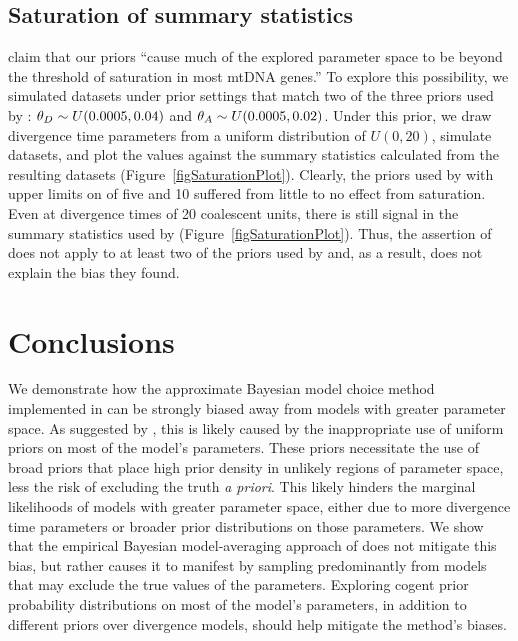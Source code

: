 \documentclass[letterpaper,12pt]{article}
\begin{document}
\begin{linenumbers}
\subsection*{Saturation of summary statistics}
\citet{Hickerson2013} claim that our priors ``cause much of the explored
parameter space to be beyond the threshold of saturation in most mtDNA genes.''
To explore this possibility, we simulated datasets under prior settings that
match two of the three priors used by \citet{Oaks2012}: $\meanDescendantTheta{}
\sim U(0.0005, 0.04)$ and $\ancestralTheta{} \sim U(0.0005, 0.02)$.
Under this prior, we draw divergence time parameters from a uniform
distribution of $U(0, 20)$, simulate datasets, and plot the \divt{} values
against the summary statistics calculated from the resulting datasets
(Figure~\ref{figSaturationPlot}).
Clearly, the priors used by \citet{Oaks2012} with upper limits on \divt{} of five
and 10 suffered from little to no effect from saturation.
Even at divergence times of 20 coalescent units, there is still signal in the
summary statistics used by \msb (Figure~\ref{figSaturationPlot}).
Thus, the assertion of \citet{Hickerson2013} does not apply to at least
two of the priors used by \citet{Oaks2012} and, as a result, does not
explain the bias they found.



\section*{Conclusions}
We demonstrate how the approximate Bayesian model choice method implemented in
\msb can be strongly biased away from models with greater parameter space.
As suggested by \citet{Oaks2012}, this is likely caused by the inappropriate
use of uniform priors on most of the model's parameters.
These priors necessitate the use of broad priors that place high prior density
in unlikely regions of parameter space, less the risk of excluding the truth
\emph{a priori}.
This likely hinders the marginal likelihoods of models with greater parameter
space, either due to more divergence time parameters or broader prior
distributions on those parameters.
We show that the empirical Bayesian model-averaging approach of
\citet{Hickerson2013} does not mitigate this bias, but rather causes it to
manifest by sampling predominantly from models that may exclude the true values
of the parameters.
Exploring cogent prior probability distributions on most of the model's
parameters, in addition to different priors over divergence models, should
help mitigate the method's biases.


\end{linenumbers}
\end{document}
